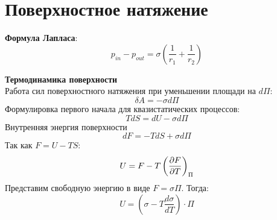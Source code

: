 \section{Поверхностное натяжение}

\noindent
\textbf{Формула Лапласа}:
\begin{equation}
p_{in}-p_{out} = \sigma \left(\frac{1}{r_1} + \frac{1}{r_2}\right)
\end{equation}

\noindent
\textbf{Термодинамика поверхности}\\
Работа сил поверхностного натяжения при уменьшении площади на $d \Pi$:
\begin{equation}
\delta A = - \sigma d \Pi
\end{equation}
Формулировка первого начала для квазистатических процессов:
$$T d S = d U - \sigma d \Pi$$
Внутренняя энергия поверхности
$$d F = - T d S + \sigma d \Pi$$
Так как $F = U - T S$:
$$U = F - T \left(\dfrac{\partial {F}}{\partial {T}} \right)_{\Pi}$$
Представим свободную энергию в виде $F = \sigma \Pi$. Тогда:
\begin{equation}
U = \left(\sigma - T \frac{d \sigma}{ d T} \right) \cdot \Pi
\end{equation}